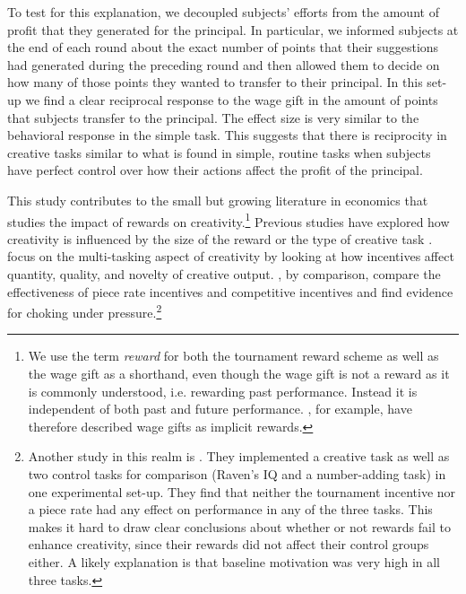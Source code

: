 To test for this explanation, we decoupled subjects' efforts from the amount of profit that they generated for 
the principal. In particular, we informed subjects at the end of each round about 
the exact number of points that their suggestions had generated 
during the preceding round and then allowed them to decide on how many 
of those points they wanted to transfer to their 
principal. In this set-up we find a clear reciprocal response to the wage gift in the 
amount of points that subjects transfer to the principal. The effect size is very similar to the behavioral response in the 
simple task. This suggests that there is reciprocity in creative tasks similar to what is found in simple, routine tasks 
 when subjects 
have perfect control over how their actions affect the profit of the principal.


 
This study contributes to the small but growing literature in economics that studies the impact
 of rewards on creativity.\footnote{We use the term \textit{reward} for both the tournament reward scheme as well as the wage gift as a shorthand, even though the wage gift is not a reward as it is commonly understood, i.e. rewarding past performance.  Instead it is independent of both past and future performance. \cite{Fehr02EER}, for example, have therefore described wage gifts as implicit rewards. }  Previous studies have explored
how creativity is influenced by the size of the reward \citep{Ariely2009b} or the type 
of  creative task \citep{charness12WP}. \citet{laske2015} focus on the multi-tasking aspect of creativity by
looking at how incentives affect quantity, quality, and novelty of creative output. 
  \citet{erat2015}, by comparison, 
compare the effectiveness of piece rate incentives and competitive incentives and find evidence for choking 
under pressure.\footnote{Another study in this realm is \cite{Eckartz2011}. 
They implemented a creative task as well as two control tasks for comparison 
(Raven's IQ and a number-adding task) in one experimental set-up. 
They find that neither the tournament incentive nor a piece rate  had any effect 
on performance in any of the three tasks. This makes it hard to draw clear conclusions 
about whether or not  rewards fail to enhance creativity, since their rewards did not affect 
their control groups either. A likely explanation is that baseline motivation was very high in all three tasks. } 


